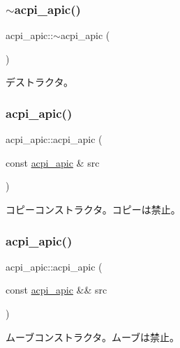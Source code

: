 \subsubsection{\texorpdfstring{$\sim$acpi\+\_\+apic()}{~acpi\_apic()}}
{\footnotesize\ttfamily acpi\+\_\+apic\+::$\sim$acpi\+\_\+apic (\begin{DoxyParamCaption}{ }\end{DoxyParamCaption})\hspace{0.3cm}{\ttfamily [virtual]}}

デストラクタ。 \hypertarget{classacpi__apic_a8f68e76b4b3f8e39c475e26954a81a2e}{}\label{classacpi__apic_a8f68e76b4b3f8e39c475e26954a81a2e} 
\subsubsection{\texorpdfstring{acpi\+\_\+apic()}{acpi\_apic()}\hspace{0.1cm}{\footnotesize\ttfamily [3/4]}}
{\footnotesize\ttfamily acpi\+\_\+apic\+::acpi\+\_\+apic (\begin{DoxyParamCaption}\item[{const \hyperlink{classacpi__apic}{acpi\+\_\+apic} \&}]{src }\end{DoxyParamCaption})\hspace{0.3cm}{\ttfamily [delete]}}

コピーコンストラクタ。コピーは禁止。 \hypertarget{classacpi__apic_a7c75e8b9a5b87493fbde26a86ffa5df0}{}\label{classacpi__apic_a7c75e8b9a5b87493fbde26a86ffa5df0} 
\subsubsection{\texorpdfstring{acpi\+\_\+apic()}{acpi\_apic()}\hspace{0.1cm}{\footnotesize\ttfamily [4/4]}}
{\footnotesize\ttfamily acpi\+\_\+apic\+::acpi\+\_\+apic (\begin{DoxyParamCaption}\item[{const \hyperlink{classacpi__apic}{acpi\+\_\+apic} \&\&}]{src }\end{DoxyParamCaption})\hspace{0.3cm}{\ttfamily [delete]}}

ムーブコンストラクタ。ムーブは禁止。 

